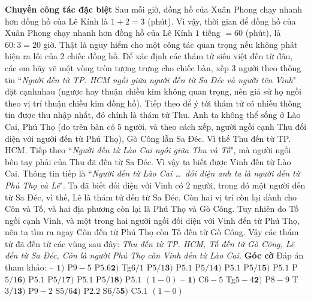 	\begin{multicols}{2}
		\textbf{\color{gocco}Chuyến công tác đặc biệt}
		\vskip 0.05cm
		Sau mỗi giờ, đồng hồ của Xuân Phong chạy nhanh hơn đồng hồ của Lê Kính là $1+2= 3$ (phút). Vì vậy, thời gian để đồng hồ của Xuân Phong chạy nhanh hơn đồng hồ của Lê Kính $1$ tiếng $= 60$ (phút), là $60:3 = 20$ giờ. Thật là nguy hiểm cho một công tác quan trọng nếu không phát hiện ra lỗi của $2$ chiếc \linebreak đồng hồ.
		\vskip 0.05cm
		Để xác định các thám tử siêu việt đến từ đâu, các em hãy vẽ một vòng tròn tượng trưng cho chiếc bàn, xếp $3$ người theo thông tin ``\textit{Người đến từ TP. HCM ngồi giữa người đến từ Sa Đéc và người tên Vinh}" đặt cạnh\linebreak nhau (ngược hay thuận chiều kim không quan trọng, nên giả sử họ ngồi theo vị trí thuận chiều kim đồng hồ).
		\vskip 0.05cm
		Tiếp theo để ý tới thám tử có nhiều thông tin được thu nhập nhất, đó chính là thám tử Thu. Anh ta không thể sống ở Lào Cai, Phú Thọ (do trên bàn có $5$ người, và theo cách xếp, người ngồi cạnh Thu đối diện với người đến từ Phú Thọ), Gò Công lẫn Sa Đéc. Vì thế Thu đến từ TP. HCM. 
		\vskip 0.05cm
		Tiếp theo ``\textit{Người đến từ Lào Cai ngồi giữa Thu và Tố}", mà người ngồi bên tay phải của Thu đã đến từ Sa Đéc. Vì vậy ta biết được Vinh đến từ Lào Cai.
		\vskip 0.05cm
		Thông tin tiếp là ``\textit{Người đến từ Lào Cai \ldots\, đối diện anh ta là người đến từ Phú Thọ và Lê}". Ta đã biết đối diện với Vinh có $2$ người, trong đó một người đến từ Sa Đéc, vì thế, Lê là thám tử đến từ Sa Đéc.
		\vskip 0.05cm
		Còn hai vị trí còn lại dành cho Côn và Tố, và hai địa phương còn lại là Phú Thọ và Gò Công. Tuy nhiên do Tố ngồi cạnh Vinh, và một trong hai người ngồi đối diện với Vinh đến từ Phú Thọ, nên ta tìm ra ngay Côn đến từ Phú Thọ còn Tố đến từ Gò Công.
		\vskip 0.05cm
		Vậy các thám tử đã đến từ các vùng sau đây: \textit{Thu đến từ TP. HCM, Tố đến từ Gò Công, Lê đến từ Sa Đéc, Côn là người Phú Thọ còn Vinh đến từ Lào Cai.}
		\vskip 0.05cm
		\textbf{\color{gocco}Góc cờ}
		\vskip 0.05cm
		Đáp án tham khảo:
		\vskip 0.05cm
		-- $\pmb{1)}$	P$9-5$ P$5.6$\quad $\pmb{2)}$ Tg$6/1$ P$5/1$\quad $\pmb{3)}$ P$5.1$ P$5/1$\quad $\pmb{4)}$ P$5.1$ P$5/1$\quad $\pmb{5)}$ P$5.1$ P$5/1$\quad $\pmb{6)}$ P$5.1$ P$5/1$\quad $\pmb{7)}$ P$5.1$ P$5/1$\quad $\pmb{8)}$ P$5.1$ $(1-0)$
		\vskip 0.05cm
		-- $\pmb{1)}$	C$6-5$ Tg$5-4$\quad $\pmb{2)}$ P$8-9$ T$3/1$\quad $\pmb{3)}$ P$9-2$ S$5/6$\quad $\pmb{4)}$ P$2.2$ S$6/5$\quad $\pmb{5)}$ C$5.1$ $(1-0)$
\end{multicols}
	
	
	
	
	
	
